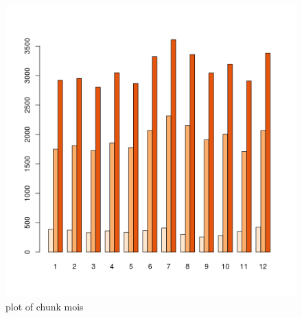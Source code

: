 \begin{Shaded}
\begin{Highlighting}[]

  \NormalTok{(}\NormalTok{, }\NormalTok{))}
\end{Highlighting}
\end{Shaded}

\begin{figure}[htbp]
\centering
\includegraphics{figure/mois9.png}
\caption{plot of chunk mois}
\end{figure}

\begin{Shaded}
\begin{Highlighting}[]

  \NormalTok{(}\NormalTok{, }\NormalTok{))}
\end{Highlighting}
\end{Shaded}

